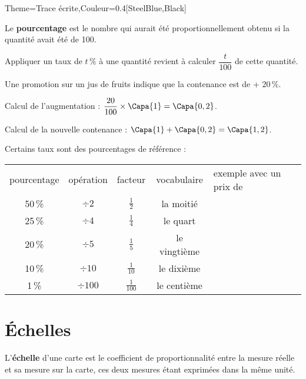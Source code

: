 \begin{Maquette}[Cours]{Theme={Trace écrite},Couleur={0.4[SteelBlue,Black]}}
   \begin{definition*}{}
      Le {\bf pourcentage} est le nombre qui aurait été proportionnellement obtenu si la quantité avait été de 100.
   \end{definition*}

   \begin{propriete*}{}
      Appliquer un taux de $t\,\%$ à une quantité revient à calculer $\dfrac{t}{100}$ de cette quantité.
   \end{propriete*}

   \begin{exemple*}{}
      Une promotion sur un jus de fruits indique que la contenance est de  + 20\,\%. \par
      Calcul de l'augmentation : $\dfrac{20}{100}\times\Capa{1} =\Capa{0,2}$. \par
      Calcul de la nouvelle contenance : $\Capa{1}+\Capa{0,2} =\Capa{1,2}$.
   \end{exemple*}

   Certains taux sont des pourcentages de référence :
   \begin{center}
      {
      \begin{tabular}{|*4{C{2}|}p{4.3cm}}
          pourcentage & opération & facteur & vocabulaire & exemple avec un prix de  \\
         50\,\% & $\div2$ & $\frac12$ & la moitié &  \\
         25\,\% & $\div4$ & $\frac14$ & le quart &  \\
         20\,\% & $\div5$ & $\frac15$ & le vingtième &  \\
         10\,\% & $\div10$ & $\frac{1}{10}$ & le dixième &  \\
         1\,\% & $\div100$ & $\frac{1}{100}$ & le centième &  \\
      \end{tabular}}
   \end{center}


\section{Échelles}

   \begin{definition*}{}
      L'\textbf{échelle} d'une carte est le coefficient de proportionnalité entre la mesure réelle et sa mesure sur la carte, ces deux mesures étant exprimées dans la même unité.
   \end{definition*}


\end{Maquette}
